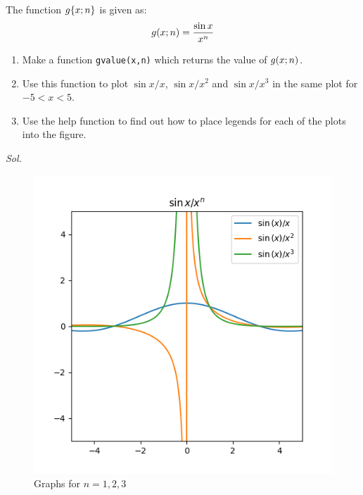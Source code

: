     \begin{problem}\label{problem_2.7}
        The function $g\qty{x;n}$ is given as:
        \begin{equation}\label{eqt = sin_x_over_xn}
            g\qty(x;n) = \frac{\sin{x}}{x^{n}} 
        \end{equation}
        \begin{enumerate}
            \item Make a function \verb|gvalue(x,n)| which returns the value of $g\qty(x;n)$.
            \item Use this function to plot $\sin{x}/x$, $\sin{x}/x^{2}$ and $\sin{x}/x^{3}$ in the same plot for $-5<x<5$.
            \item Use the help function to find out how to place legends for each of the plots into the figure.
        \end{enumerate}
    \end{problem}
    \textit{ Sol. }
    
    \begin{figure}[h!]
        \centering
        \includegraphics[width=0.5\linewidth]{img/chapter2/2-7/2_7_plot_sinx.png}
        \caption{Graphs for $n=1,2,3$}
        \label{fig:problem 2-7}
    \end{figure}



